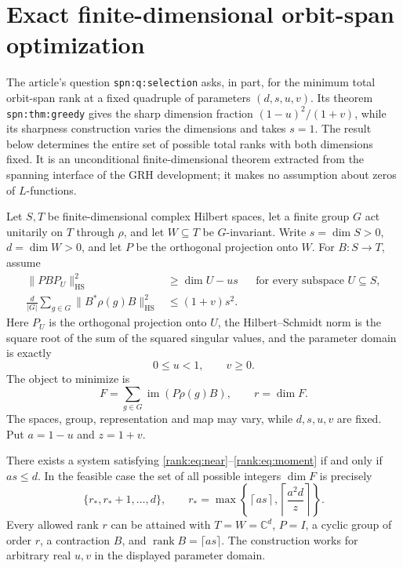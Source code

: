 \section{Exact finite-dimensional orbit-span optimization}
\label{sec:exact-finite-rank}

The article's question \texttt{spn:q:selection} asks, in part, for the
minimum total orbit-span rank at a fixed quadruple of parameters
$(d,s,u,v)$. Its theorem \texttt{spn:thm:greedy} gives the sharp dimension
fraction $(1-u)^2/(1+v)$, while its sharpness construction varies the
dimensions and takes $s=1$. The result below determines the entire set of
possible total ranks with both dimensions fixed. It is an unconditional
finite-dimensional theorem extracted from the spanning interface of the
GRH development; it makes no assumption about zeros of $L$-functions.

Let $S,T$ be finite-dimensional complex Hilbert spaces, let a finite group
$G$ act unitarily on $T$ through $\rho$, and let $W\subseteq T$ be
$G$-invariant. Write $s=\dim S>0$, $d=\dim W>0$, and let $P$ be the
orthogonal projection onto $W$. For $B:S\to T$, assume
\begin{align}
 \|PBP_U\|_{\mathrm{HS}}^2&\ge \dim U-us
       &&\text{for every subspace }U\subseteq S,\label{rank:eq:near}\\
 \frac{d}{|G|}\sum_{g\in G}\|B^*\rho(g)B\|_{\mathrm{HS}}^2
       &\le(1+v)s^2.\label{rank:eq:moment}
\end{align}
Here $P_U$ is the orthogonal projection onto $U$, the Hilbert--Schmidt
norm is the square root of the sum of the squared singular values,
and the parameter domain is exactly
\[
             0\le u<1,\qquad v\ge0.
\]
The object to minimize is
\[
 F=\sum_{g\in G}\operatorname{im}(P\rho(g)B),\qquad r=\dim F.
\]
The spaces, group, representation and map may vary, while $d,s,u,v$
are fixed. Put $a=1-u$ and $z=1+v$.

\begin{theorem}
\label{rank:thm:spectrum}
There exists a system satisfying \eqref{rank:eq:near}--\eqref{rank:eq:moment}
if and only if $as\le d$. In the feasible case the set of all possible
integers $\dim F$ is precisely
\[
 \{r_*,r_*+1,\ldots,d\},\qquad
 r_* =\max\left\{\left\lceil as\right\rceil,
                    \left\lceil\frac{a^2d}{z}\right\rceil\right\}.
\]
Every allowed rank $r$ can be attained with $T=W=\mathbb C^d$, $P=I$,
a cyclic group of order $r$, a contraction $B$, and
$\operatorname{rank}B=\lceil as\rceil$. The construction works for
arbitrary real $u,v$ in the displayed parameter domain.
\end{theorem}

